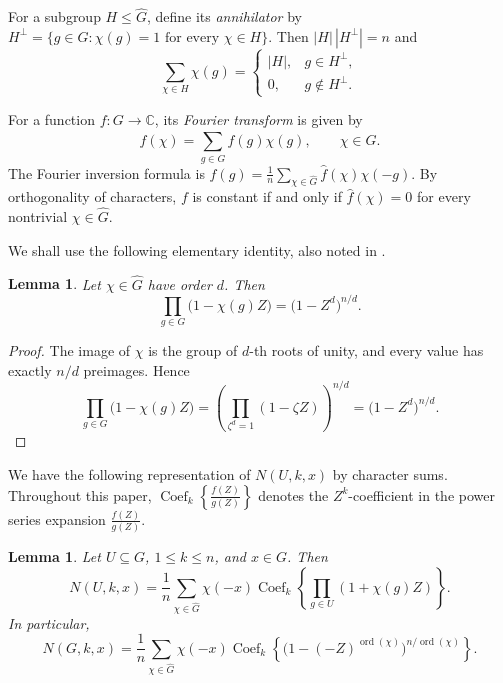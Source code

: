 \documentclass[11pt]{article}
\newtheorem{lemma}[theorem]{Lemma}
\theoremstyle{definition}
\DeclareMathOperator{\ord}{ord}
\begin{document}
For a subgroup $H\le\widehat G$, define its \emph{annihilator} by $H^\perp
=
\{g\in G:\chi(g)=1\text{ for every }\chi\in H\}$. Then $|H|\,|H^\perp|=n$ and
\begin{equation}\label{eq:subgroup-orthogonality}
	\sum_{\chi\in H}\chi(g)=
	\begin{cases}
		|H|,&g\in H^\perp,\\
		0,&g\notin H^\perp.
	\end{cases}
\end{equation}

For a function $f:G\to\mathbb C$, its \emph{Fourier transform} is given by
$$
\widehat f(\chi)
=
\sum_{g\in G}f(g)\chi(g),
\qquad
\chi\in\widehat G.
$$
The Fourier inversion formula is $f(g)
=
\frac1n
\sum_{\chi\in\widehat G}
\widehat f(\chi)\chi(-g)$. By orthogonality of characters, $f$ is constant if and only if
$\widehat f(\chi)=0$ for every nontrivial $\chi\in\widehat G$. 


We shall use the following elementary identity, also noted in \cite{Kosters2013}.


\begin{lemma}
	\label{lem:product-identity}
	Let \(\chi\in\widehat G\) have order \(d\).  Then
	\[
	\prod_{g\in G}\bigl(1-\chi(g)Z\bigr)
	=
	\bigl(1-Z^d\bigr)^{n/d}.
	\]
\end{lemma}

\begin{proof}
	The image of $\chi$ is the group of $d$-th roots of unity, and every value
	has exactly $n/d$ preimages. Hence
	$$
	\prod_{g\in G}\bigl(1-\chi(g)Z\bigr)
	=
	\left(
	\prod_{\zeta^d=1}(1-\zeta Z)
	\right)^{n/d}
	=
	\bigl(1-Z^d\bigr)^{n/d}.
	$$
\end{proof}



We have the following representation of $N(U,k,x)$ by character sums. Throughout this paper, \(\operatorname{Coef}_{k}\left\{\frac{f(Z)}{g(Z)}\right\}\) denotes the $Z^k$-coefficient in the power series expansion $\frac{f(Z)}{g(Z)}$.

\begin{lemma}\label{lem:subset-sum-fourier}
	Let \(U\subseteq G\), \(1\le k\le n\), and \(x\in G\). Then
	\begin{equation}\label{eq:subset-sum-character-formula}
		N(U,k,x)=\frac1n\sum_{\chi\in\widehat G}\chi(-x)
		\operatorname{Coef}_{k}\left\{\prod_{g\in U}(1+\chi(g)Z)\right\}.
	\end{equation}
	In particular,
	\begin{equation}\label{eq:group-subset-sum-character-formula}
		N(G,k,x)=\frac1n\sum_{\chi\in\widehat G}
		\chi(-x)\operatorname{Coef}_{k}\left\{\bigl(1-(-Z)^{\ord(\chi)}\bigr)^{n/\ord(\chi)}\right\}.
	\end{equation}
	
	
\end{lemma}
\end{document}
